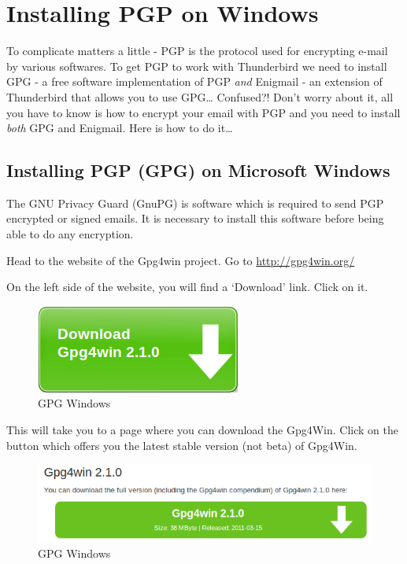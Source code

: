 \section{Installing PGP on Windows}

To complicate matters a little - PGP is the protocol used for encrypting
e-mail by various softwares. To get PGP to work with Thunderbird we need
to install GPG - a free software implementation of PGP \emph{and}
Enigmail - an extension of Thunderbird that allows you to use
GPG\ldots{} Confused?! Don't worry about it, all you have to know is how
to encrypt your email with PGP and you need to install \emph{both} GPG
and Enigmail. Here is how to do it\ldots{}

\subsection{Installing PGP (GPG) on Microsoft Windows}

The GNU Privacy Guard (GnuPG) is software which is required to send PGP
encrypted or signed emails. It is necessary to install this software
before being able to do any encryption.

Head to the website of the Gpg4win project. Go to
\href{http://gpg4win.org/}{http://gpg4win.org/}

On the left side of the website, you will find a `Download' link. Click
on it.

\begin{figure}[htbp]
\centering
\includegraphics{gpg_win.png}
\caption{GPG Windows}
\end{figure}

This will take you to a page where you can download the Gpg4Win. Click
on the button which offers you the latest stable version (not beta) of
Gpg4Win.

\begin{figure}[htbp]
\centering
\includegraphics{gpg_win_2.png}
\caption{GPG Windows}
\end{figure}

